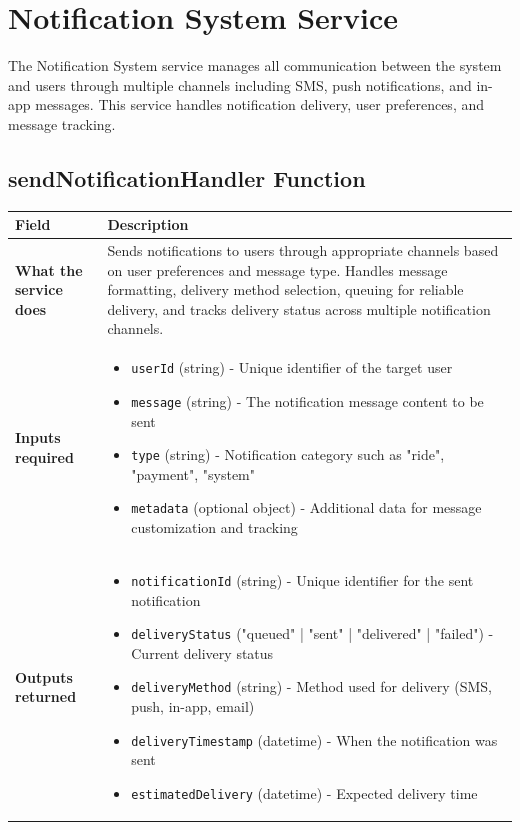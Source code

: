 \documentclass[11pt,a4paper]{article}
\begin{document}
\section{Notification System Service}

The Notification System service manages all communication between the system and users through multiple channels including SMS, push notifications, and in-app messages. This service handles notification delivery, user preferences, and message tracking.

\subsection{sendNotificationHandler Function}

\begin{longtable}{|p{4cm}|p{12cm}|}
\hline
\textbf{Field} & \textbf{Description} \\
\hline
\textbf{What the service does} & 
Sends notifications to users through appropriate channels based on user preferences and message type. Handles message formatting, delivery method selection, queuing for reliable delivery, and tracks delivery status across multiple notification channels. \\
\hline
\textbf{Inputs required} & 
\begin{itemize}[nosep]
\item \texttt{userId} (string) - Unique identifier of the target user
\item \texttt{message} (string) - The notification message content to be sent
\item \texttt{type} (string) - Notification category such as "ride", "payment", "system"
\item \texttt{metadata} (optional object) - Additional data for message customization and tracking
\end{itemize} \\
\hline
\textbf{Outputs returned} & 
\begin{itemize}[nosep]
\item \texttt{notificationId} (string) - Unique identifier for the sent notification
\item \texttt{deliveryStatus} ("queued" | "sent" | "delivered" | "failed") - Current delivery status
\item \texttt{deliveryMethod} (string) - Method used for delivery (SMS, push, in-app, email)
\item \texttt{deliveryTimestamp} (datetime) - When the notification was sent
\item \texttt{estimatedDelivery} (datetime) - Expected delivery time

\end{itemize}
\end{longtable}
\end{document}
